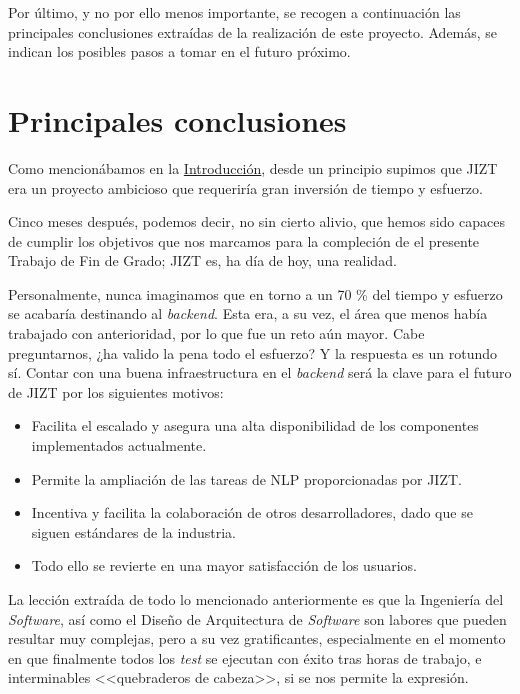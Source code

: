 
\vspace{-1cm}
Por último, y no por ello menos importante, se recogen a continuación las principales conclusiones extraídas de la realización de este proyecto. Además, se indican los posibles pasos a tomar en el futuro próximo.

\section{Principales conclusiones}

Como mencionábamos en la \hyperref[chapter:intro]{Introducción}, desde un principio supimos que JIZT era un proyecto ambicioso que requeriría gran inversión de tiempo y esfuerzo.

Cinco meses después, podemos decir, no sin cierto alivio, que hemos sido capaces de cumplir los objetivos que nos marcamos para la compleción de el presente Trabajo de Fin de Grado; JIZT es, ha día de hoy, una realidad.

Personalmente, nunca imaginamos que en torno a un 70 \% del tiempo y esfuerzo se acabaría destinando al \emph{backend}. Esta era, a su vez, el área que menos había trabajado con anterioridad, por lo que fue un reto aún mayor. Cabe preguntarnos, ¿ha valido la pena todo el esfuerzo? Y la respuesta es un rotundo sí. Contar con una buena infraestructura en el \emph{backend} será la clave para el futuro de JIZT por los siguientes motivos:

\vspace{-0.2cm}
\begin{itemize}
	\item [\textbullet] Facilita el escalado y asegura una alta disponibilidad de los componentes implementados actualmente.
	\vspace{-0.2cm}
	\item [\textbullet] Permite la ampliación de las tareas de NLP proporcionadas por JIZT.
	\vspace{-0.2cm}
	\item [\textbullet] Incentiva y facilita la colaboración de otros desarrolladores, dado que se siguen estándares de la industria.
	\vspace{-0.2cm}
	\item [\textbullet] Todo ello se revierte en una mayor satisfacción de los usuarios.
\end{itemize}

\vspace{-0.3cm}
La lección extraída de todo lo mencionado anteriormente es que la Ingeniería del \emph{Software}, así como el Diseño de Arquitectura de \emph{Software} son labores que pueden resultar muy complejas, pero a su vez gratificantes, especialmente en el momento en que finalmente todos los \emph{test} se ejecutan con éxito tras horas de trabajo, e interminables <<quebraderos de cabeza>>, si se nos permite la expresión.

